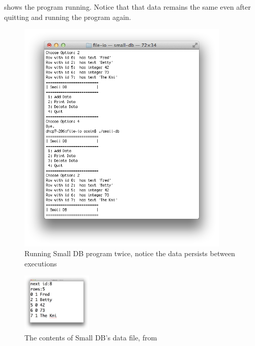  shows the program running. Notice that that data remains the same even after quitting and running the program again. 


\begin{figure}[p]
   \centering
   \includegraphics[width=0.9\textwidth]{./topics/file-io/images/SmallDBRunning} 
   \caption{Running Small DB program twice, notice the data persists between executions}
   \label{fig:small_db_3_running}
\end{figure}

\begin{figure}[p]
   \centering
   \includegraphics[width=0.3\textwidth]{./topics/file-io/images/DataText} 
   \caption{The contents of Small DB's data file, from }
   \label{fig:small_db_3_data_text}
\end{figure}




